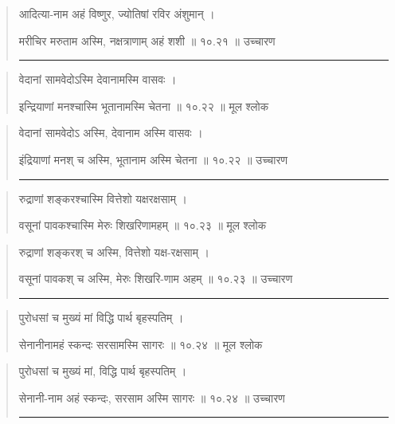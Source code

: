 \begin{quotation}

आदित्या-नाम अहं विष्णुर, ज्योतिषां रविर अंशुमान्‌  ।  

मरीचिर मरुताम अस्मि, नक्षत्राणाम् अहं शशी  ॥ १०.२१ ॥  उच्चारण

\noindent\rule{16cm}{0.4pt} 
\end{quotation}


\begin{quotation} 


वेदानां सामवेदोऽस्मि देवानामस्मि वासवः ।  

इन्द्रियाणां मनश्चास्मि भूतानामस्मि चेतना  ॥ १०.२२ ॥  मूल श्लोक
\end{quotation}

\begin{quotation}

वेदानां सामवेदोऽ अस्मि, देवानाम अस्मि वासवः  ।  

इंद्रियाणां मनश् च अस्मि, भूतानाम अस्मि चेतना  ॥ १०.२२ ॥  उच्चारण

\noindent\rule{16cm}{0.4pt} 
\end{quotation}


\begin{quotation} 

रुद्राणां शङ्करश्चास्मि वित्तेशो यक्षरक्षसाम् ।  

वसूनां पावकश्चास्मि मेरुः शिखरिणामहम्  ॥ १०.२३ ॥  मूल श्लोक
\end{quotation}

\begin{quotation}

रुद्राणां शङ्करश्  च अस्मि, वित्तेशो यक्ष-रक्षसाम्‌  ।  

वसूनां पावकश् च अस्मि, मेरुः शिखरि-णाम अहम्‌  ॥ १०.२३ ॥  उच्चारण

\noindent\rule{16cm}{0.4pt} 
\end{quotation}


\begin{quotation} 

पुरोधसां च मुख्यं मां विद्धि पार्थ बृहस्पतिम्‌  ।  

सेनानीनामहं स्कन्दः सरसामस्मि सागरः  ॥ १०.२४ ॥  मूल श्लोक
\end{quotation}

\begin{quotation}

पुरोधसां च मुख्यं मां, विद्धि पार्थ बृहस्पतिम्‌  ।  

सेनानी-नाम अहं स्कन्दः, सरसाम अस्मि सागरः  ॥ १०.२४ ॥  उच्चारण

\noindent\rule{16cm}{0.4pt} 
\end{quotation}


